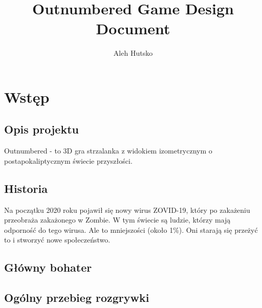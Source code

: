 \documentclass[letterpaper,12pt]{report}
\author{Aleh Hutsko}
\title{Outnumbered Game Design Document}
\date{}
\begin{document}
    \maketitle
    \clearpage
    \tableofcontents
    \clearpage
    \chapter{Wstęp}
    \section{Opis projektu}

    Outnumbered - to 3D gra strzalanka z widokiem
    izometrycznym o postapokaliptycznym świecie przyszłości.

    \section{Historia}

    Na początku 2020 roku pojawił się nowy wirus ZOVID-19,
    który po zakażeniu przeobraża zakażonego w Zombie. W tym
    świecie są ludzie, którzy mają odporność do tego wirusa.
    Ale to mniejszości (około 1\%). Oni starają się przeżyć to
    i stworzyć nowe społeczeństwo.

    \section{Główny bohater}

    \section{Ogólny przebieg rozgrywki}
\end{document}
